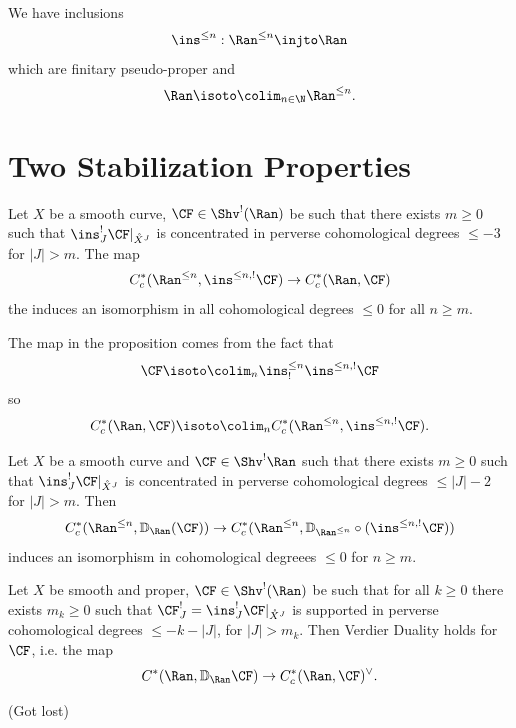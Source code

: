 \documentclass[oneside]{amsart}
\newcommand{\VD}{\mathbb{D}}
\begin{document}
We have inclusions
\[
\ins^{\le n}:\Ran^{\le n}\injto \Ran
\] 
which are finitary pseudo-proper and
\[
\Ran \isoto \colim_{n\in \N}\Ran^{\le n}.
\] 

\section{Two Stabilization Properties}
\begin{proposition}
	Let $X$ be a smooth curve, $\CF\in \Shv^{!}(\Ran)$ be such that there exists $m\ge 0$ such that $\ins_J^{!}\CF|_{\mathring{X}^{J}}$ is concentrated in perverse cohomological degrees $\le -3$ for $|J| > m$. The map
	\[
		C^{*}_c(\Ran^{\le n},\ins^{\le n,!}\CF) \to C^{*}_c(\Ran,\CF)
	\] 
	the induces an isomorphism in all cohomological degrees $\le 0$ for all $n\ge m$.
\end{proposition}
The map in the proposition comes from the fact that
\[
\CF \isoto \colim_n \ins^{\le n}_!\ins^{\le n,!}\CF
\] 
so
\[
C_c^{*}(\Ran,\CF) \isoto \colim_{n}C_c^{*}(\Ran^{\le n},\ins^{\le n,!}\CF).
\] 

\begin{proposition}
	Let $X$ be a smooth curve and $\CF\in \Shv^{!}\Ran$ such that there exists $m\ge 0$ such that $\ins_J^{!}\CF|_{\mathring{X}^{J}}$ is concentrated in perverse cohomological degrees $\le |J|-2$ for $|J|>m$. Then
	\[
	C^{*}_c(\Ran^{\le n},\VD_{\Ran}(\CF)) \to C^{*}_c(\Ran^{\le n},\VD_{\Ran^{\le n}}\circ(\ins^{\le n,!}\CF))
	\] 
	induces an isomorphism in cohomological degreees $\le 0$ for $n\ge m$.
\end{proposition}

\begin{theorem}
	Let $X$ be smooth and proper, $\CF\in \Shv^{!}(\Ran)$ be such that for all $k\ge 0$ there exists $m_k\ge 0$ such that $\CF^{!}_J=\ins_J^{!}\CF|_{\mathring{X}^{J}}$ is supported in perverse cohomological degrees $\le -k-|J|$, for $|J|>m_k$. Then Verdier Duality holds for $\CF$, i.e. the map
	\[
	C^{*}(\Ran,\VD_{\Ran}\CF) \to C_c^{*}(\Ran,\CF)^{\vee}.
	\] 
\end{theorem}
(Got lost)
\end{document}
